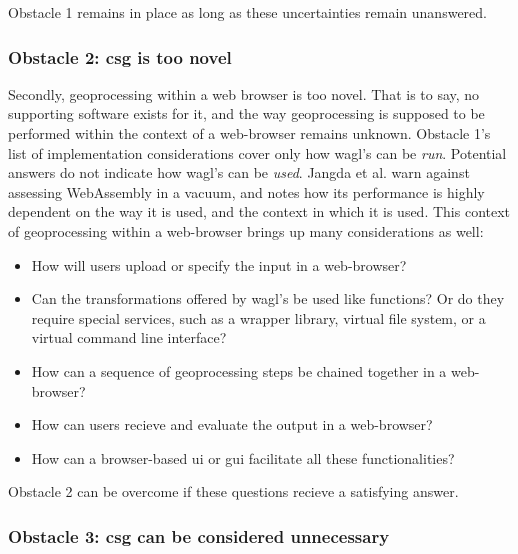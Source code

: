 Obstacle 1 remains in place as long as these uncertainties remain unanswered. 

\subsubsection*{Obstacle 2: \ac{csg} is too novel}

Secondly, geoprocessing within a web browser is too novel. That is to say, no supporting software exists for it, and the way geoprocessing is supposed to be performed within the context of a web-browser remains unknown. Obstacle 1's list of implementation considerations cover only how \ac{wagl}'s can be \emph{run}. Potential answers do not indicate how \ac{wagl}'s can be \emph{used}. Jangda et al. warn against assessing WebAssembly in a vacuum, and notes how its performance is highly dependent on the way it is used, and the context in which it is used. This context of geoprocessing within a web-browser brings up many considerations as well: 

\begin{itemize}
  \item How will users upload or specify the input in a web-browser?
  \item Can the transformations offered by \ac{wagl}'s be used like functions? Or do they require special services, such as a wrapper library, virtual file system, or a virtual command line interface? 
  \item How can a sequence of geoprocessing steps be chained together in a web-browser?
  \item How can users recieve and evaluate the output in a web-browser?
  \item How can a browser-based \ac{ui} or \ac{gui} facilitate all these functionalities?
\end{itemize}

Obstacle 2 can be overcome if these questions recieve a satisfying answer. 

\subsubsection*{Obstacle 3: \ac{csg} can be considered unnecessary}

